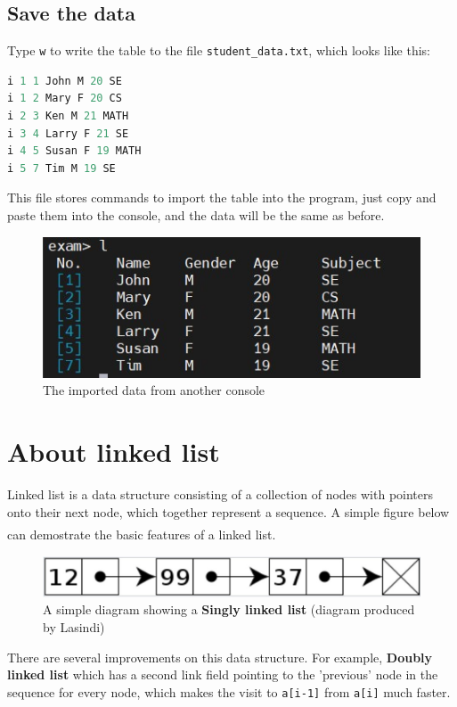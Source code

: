 \documentclass[cn,black,12pt,normal]{elegantnote}
\newcommand{\uct}[1]{\textsuperscript{\textsuperscript{\cite{#1}}}}
\begin{document}
\subsection{Save the data}

Type \lstinline{w} to write the table to the file \lstinline{student_data.txt}, which looks like this:
\begin{lstlisting}[language = C++]
i 1 1 John M 20 SE
i 1 2 Mary F 20 CS
i 2 3 Ken M 21 MATH
i 3 4 Larry F 21 SE
i 4 5 Susan F 19 MATH
i 5 7 Tim M 19 SE
\end{lstlisting}
This file stores commands to import the table into the program, just copy and paste them into the console, and the data will be the same as before.

\begin{figure}[H]
    \centering
    \includegraphics[width=0.5\linewidth]{image/exam_06.jpg}
    \caption{The imported data from another console}
\end{figure}

\section{About linked list}

Linked list is a data structure consisting of a collection of nodes with pointers onto their next node, which together represent a sequence. A simple figure below can demostrate the basic features of a linked list. \uct{wiki:Linked_list}

\begin{figure}[H]
    \centering
    \includegraphics[width=1.0\linewidth]{image/ll_01.jpg}
    \caption{A simple diagram showing a \textbf{Singly linked list} (diagram produced by Lasindi)}
\end{figure}

There are several improvements on this data structure. For example, \textbf{Doubly linked list} which has a second link field pointing to the 'previous' node in the sequence for every node, which makes the visit to \lstinline{a[i-1]} from \lstinline{a[i]} much faster.
\end{document}

